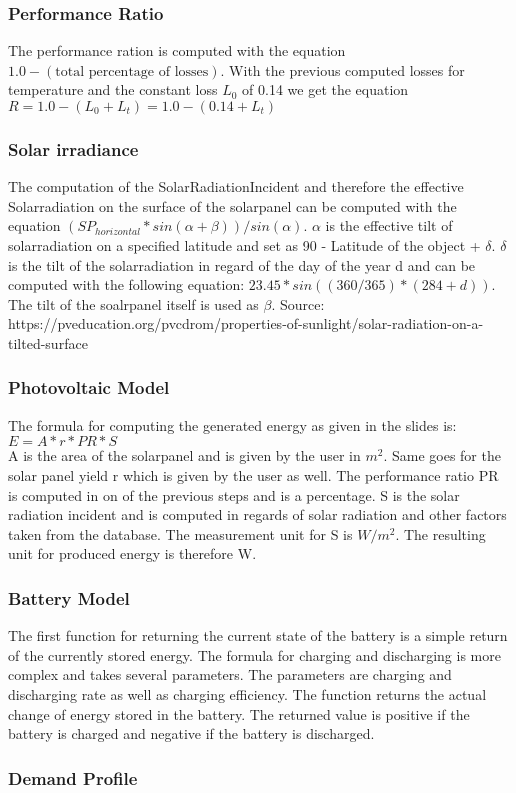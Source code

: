 \subsubsection{Performance Ratio}
The performance ration is computed with the equation $1.0 - (\text{total percentage of losses})$.
With the previous computed losses for temperature and the constant loss $L_0$ of 0.14 we get the equation $R = 1.0 - (L_0 + L_t) = 1.0 - (0.14 + L_t)$
\subsubsection{Solar irradiance}
The computation of the SolarRadiationIncident and therefore the effective Solarradiation on the surface of the solarpanel can be computed with the equation $(SP_{horizontal} * sin(\alpha + \beta))/sin(\alpha)$.
$\alpha$ is the effective tilt of solarradiation on a specified latitude and set as 90 - Latitude of the object + $\delta$.
$\delta$ is the tilt of the solarradiation in regard of the day of the year d and can be computed with the following equation: $23.45 * sin((360/365) * (284 + d))$.
The tilt of the soalrpanel itself is used as $\beta$.
Source: https://pveducation.org/pvcdrom/properties-of-sunlight/solar-radiation-on-a-tilted-surface
\subsubsection{Photovoltaic Model}
The formula for computing the generated energy as given in the slides is: $E = A * r * PR * S$\\
A is the area of the solarpanel and is given by the user in $m^{2}$.
Same goes for the solar panel yield r which is given by the user as well.
The performance ratio PR  is computed in on of the previous steps and is  a percentage.
S is the solar radiation incident and is computed in regards of solar radiation and other factors taken from the database.
The measurement unit for S is $W/m^{2}$.
The resulting unit for produced energy is therefore W.
\subsubsection{Battery Model}
The first function for returning the current state of the battery is a simple return of the currently stored energy.
The formula for charging and discharging is more complex and takes several parameters.
The parameters are charging and discharging rate as well as charging efficiency.
The function returns the actual change of energy stored in the battery.
The returned value is positive if the battery is charged and negative if the battery is discharged.
\subsubsection{Demand Profile}
